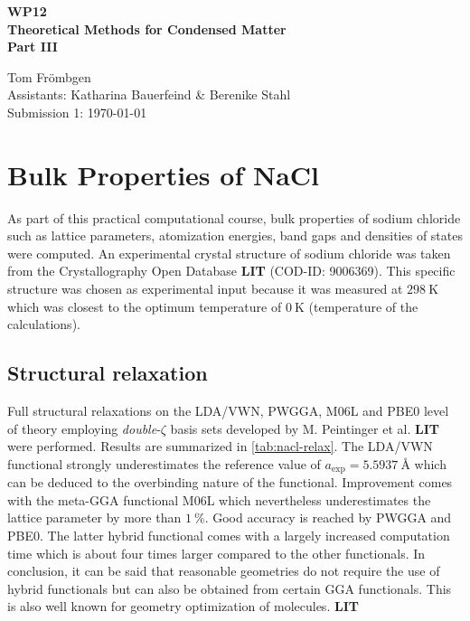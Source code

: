 \documentclass[a4paper,12pt]{scrartcl}
\begin{document}
%
\thispagestyle{empty}

%
\begin{center}
	\begin{LARGE}
		\vspace{50mm}
		\textbf{WP12} \\
		\vspace{15mm}
		\textbf{Theoretical Methods for Condensed Matter} \\
		\vspace{15mm}
		\textbf{Part III} \\
		\vspace{30mm}
	\end{LARGE}
	\begin{large}
		Tom Frömbgen \\
		\vspace{20mm}
		Assistants: Katharina Bauerfeind \& Berenike Stahl  \\
		\vspace{10mm}
		Submission 1: \today \\
		\vspace{5mm}
	\end{large}
\end{center}

%
%
\newpage
{}
\section{Bulk Properties of NaCl}
%
As part of this practical computational course, bulk properties of sodium chloride such as lattice parameters, atomization energies, band gaps and densities of states were computed. An experimental crystal structure of sodium chloride was taken from the Crystallography Open Database \textbf{LIT} (COD-ID: 9006369). This specific structure was chosen as experimental input because it was measured at $ \SI{298}{\kelvin} $ which was closest to the optimum temperature of $ \SI{0}{\kelvin} $ (temperature of the calculations).
%
\subsection{Structural relaxation}
%
Full structural relaxations on the LDA/VWN, PWGGA, M06L and PBE0 level of theory employing \textit{double}-$\zeta$ basis sets developed by M. Peintinger et al. \textbf{LIT} were performed. Results are summarized in \autoref{tab:nacl-relax}. The LDA/VWN functional strongly underestimates the reference value of $ a_\mathrm{exp} = \SI{5.5937}{\angstrom} $ which can be deduced to the overbinding nature of the functional. Improvement comes with the meta-GGA functional M06L which nevertheless underestimates the lattice parameter by more than $ \SI{1}{\percent} $. Good accuracy is reached by PWGGA and PBE0. The latter hybrid functional comes with a largely increased computation time which is about four times larger compared to the other functionals. In conclusion, it can be said that reasonable geometries do not require the use of hybrid functionals but can also be obtained from certain GGA functionals. This is also well known for geometry optimization of molecules. \textbf{LIT}
%
\end{document}
